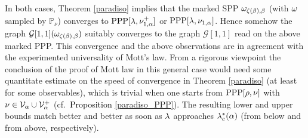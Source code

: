 \documentclass[12pt,a4paper,reqno]{amsart}
\newcommand{\cG}{\ensuremath{\mathcal G}}
\newcommand{\cV}{\ensuremath{\mathcal V}}
\newcommand{\bbP}{{\ensuremath{\mathbb P}} }
\let\a=\alpha \let\b=\beta   \let\d=\delta  \let\e=\varepsilon
\newcommand{\rosso}{\textcolor{black}} %
\newcommand{\orc}{\textcolor{black}} %
\newcommand{\cv}{\rosso{\cV_\alpha}}
\newcommand{\cvp}{\rosso{\cV^+_\alpha}}
\begin{document}
   In both cases, Theorem \ref{paradiso} implies that the marked SPP $\o_{\z(\b), \b}$ (with $\omega$ sampled by $\bbP_\nu$)
   converges to ${\rm PPP}[\l, \nu^+_{1, \a}]$  or  
${\rm PPP}[\l, \nu_{1, \a}]$. Hence somehow  the   graph $\cG[1,1](\o_{\z(\b), \b})$ 
suitably converges to the graph $\cG[1,1]$ read on the above marked PPP. This convergence and the above observations are in agreement with the experimented universality of Mott's law. 
 From a rigorous viewpoint the conclusion of the proof  of Mott  law in this general case would need some quantitate estimate on the speed of convergence in Theorem \ref{paradiso} (at least for some observables), which is trivial when one starts from  ${\rm PPP}[\rho,\nu]$ with $\nu\in \cv\cup \cvp$ (cf.~\orc{Proposition \ref{paradiso_PPP}}).  The resulting lower and upper bounds match better and better as soon as $\lambda$ approaches $\l_c^*(\a)$ (from below and from above, respectively).  
 
\end{document}
